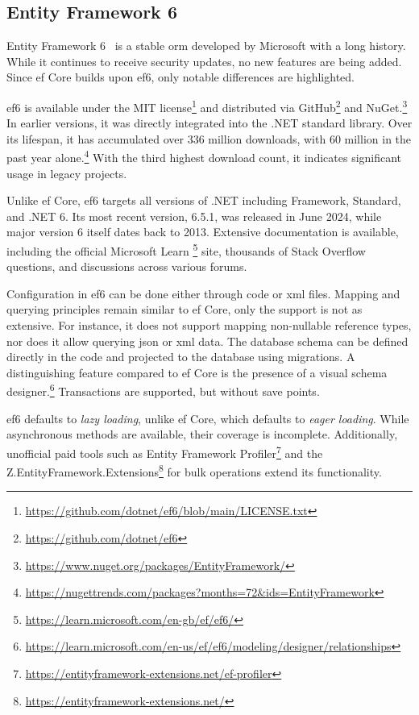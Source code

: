 \subsection{Entity Framework 6}
Entity Framework 6~\cite{ef6,ef6Repo} is a stable \acrshort{orm} developed by Microsoft with a long history. While it continues to receive security updates, no new features are being added. Since \acrshort{ef} Core builds upon \acrshort{ef}6, only notable differences are highlighted.

\acrshort{ef}6 is available under the MIT license\footnote{\url{https://github.com/dotnet/ef6/blob/main/LICENSE.txt}} and distributed via GitHub\footnote{\url{https://github.com/dotnet/ef6}} and NuGet.\footnote{\url{https://www.nuget.org/packages/EntityFramework/}} In earlier versions, it was directly integrated into the .NET standard library. Over its lifespan, it has accumulated over 336 million downloads, with 60 million in the past year alone.\footnote{\url{https://nugettrends.com/packages?months=72&ids=EntityFramework}} With the third highest download count, it indicates significant usage in legacy projects.

Unlike \acrshort{ef} Core, \acrshort{ef}6 targets all versions of .NET including Framework, Standard, and .NET 6. Its most recent version, 6.5.1, was released in June 2024, while major version 6 itself dates back to 2013. Extensive documentation is available, including the official Microsoft Learn \footnote{\url{https://learn.microsoft.com/en-gb/ef/ef6/}} site, thousands of Stack Overflow questions, and discussions across various forums.

Configuration in \acrshort{ef}6 can be done either through code or \acrshort{xml} files. Mapping and querying principles remain similar to \acrshort{ef} Core, only the support is not as extensive. For instance, it does not support mapping non-nullable reference types, nor does it allow querying \acrshort{json} or \acrshort{xml} data.
The database schema can be defined directly in the code and projected to the database using migrations. A distinguishing feature compared to \acrshort{ef} Core is the presence of a visual schema designer.\footnote{\url{https://learn.microsoft.com/en-us/ef/ef6/modeling/designer/relationships}} Transactions are supported, but without save points. 

\acrshort{ef}6 defaults to \textit{lazy loading}, unlike \acrshort{ef} Core, which defaults to \textit{eager loading}. While asynchronous methods are available, their coverage is incomplete. Additionally, unofficial paid tools such as Entity Framework Profiler\footnote{\url{https://entityframework-extensions.net/ef-profiler}} and the Z.EntityFramework.Extensions\footnote{\url{https://entityframework-extensions.net/}} for bulk operations extend its functionality.

